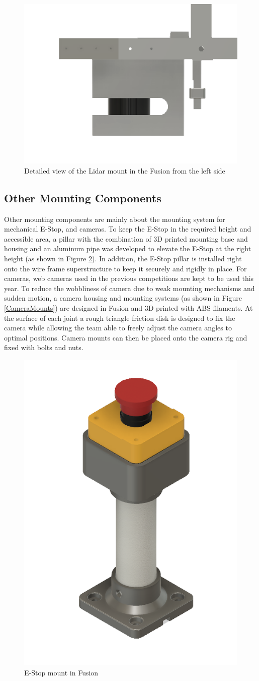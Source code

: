 \documentclass[11pt,journal]{IEEEtran}
\begin{document}
\begin{figure}[h]
\centerline{\includegraphics[width=0.5\columnwidth]{2018LidarMount.png}}
\caption{Detailed view of the Lidar mount in the Fusion from the left side}
\label{Lidar1}
\end{figure}

\subsection{Other Mounting Components}
Other mounting components are mainly about the mounting system for mechanical E-Stop, and cameras. To keep the E-Stop in the required height and accessible area, a pillar with the combination of 3D printed mounting base and housing and an aluminum pipe was developed to elevate the E-Stop at the right height (as shown in Figure \ref{ESTOPMount}). In addition, the E-Stop pillar is installed right onto the wire frame superstructure to keep it securely and rigidly in place. For cameras, web cameras used in the previous competitions are kept to be used this year. To reduce the wobbliness of camera due to weak mounting mechanisms and sudden motion, a camera housing and mounting systems (as shown in Figure \ref{CameraMounts}) are designed in Fusion and 3D printed with ABS filaments. At the surface of each joint a rough triangle friction disk is designed to fix the camera while allowing the team able to freely adjust the camera angles to optimal positions. Camera mounts can then be placed onto the camera rig and fixed with bolts and nuts.

\begin{figure}[h]
\centerline{\includegraphics[width=0.5\columnwidth]{2018DesignMechESTOP.png}}
\caption{E-Stop mount in Fusion}
\label{ESTOPMount}
\end{figure}
\end{document}
